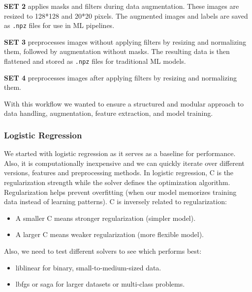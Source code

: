 \documentclass{article}
\begin{document}
\textbf{SET 2} applies masks and filters during data augmentation. These images are resized to 128*128 and 20*20 pixels. The augmented images and labels are saved as \texttt{.npz} files for use in ML pipelines.

\textbf{SET 3 } preprocesses images without applying filters by resizing and normalizing them, followed by augmentation without masks. The resulting data is then flattened and stored as \texttt{.npz} files for traditional ML models.

\textbf{SET 4 }preprocesses images after applying filters by resizing and normalizing them.

With this workflow we wanted to ensure a structured and modular approach to data handling, augmentation, feature extraction, and model training.
\\

\subsubsection{Logistic Regression}
We started with logistic regression as it serves as a baseline for performance. Also, it is computationally inexpensive and we can quickly iterate over different versions, features and preprocessing methods. In logistic regression, C is the regularization strength while the solver defines the optimization algorithm.	Regularization helps prevent overfitting (when our model memorizes training data instead of learning patterns).
C is inversely related to regularization:
\begin{itemize}
    \item A smaller C means stronger regularization (simpler model).
    \item A larger C means weaker regularization (more flexible model).
\end{itemize}
Also, we need to test different solvers to see which performs best:
\begin{itemize}
    \item liblinear for binary, small-to-medium-sized data.
    \item lbfgs or saga for larger datasets or multi-class problems.
\end{itemize}
\end{document}
